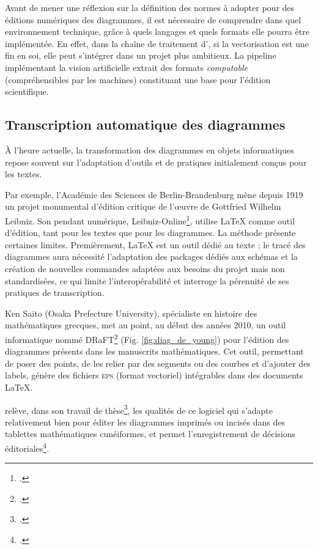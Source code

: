 Avant de mener une réflexion sur la définition des normes à adopter pour
des éditions numériques des diagrammes, il est nécessaire de comprendre
dans quel environnement technique, grâce à quels langages et quels
formats elle pourra être implémentée. En effet, dans la chaîne de
traitement d'\eida, si la vectorisation est une fin en soi, elle peut
s'intégrer dans un projet plus ambitieux. La pipeline implémentant la
vision artificielle extrait des formats \emph{computable}
(compréhensibles par les machines) constituant une base pour l'édition
scientifique.

\hypertarget{transcription-automatique-des-diagrammes}{%
\subsection{Transcription automatique des
diagrammes}\label{transcription-automatique-des-diagrammes}}

À l'heure actuelle, la transformation des diagrammes en objets
informatiques repose souvent sur l'adaptation d'outils et de pratiques
initialement conçus pour les textes.

Par exemple, l'Académie des Sciences de Berlin-Brandenburg mène depuis
1919 un projet monumental d'édition critique de l'œuvre de Gottfried
Wilhelm Leibniz. Son pendant numérique, Leibniz-Online\footcite{noauthor_leibniz_nodate}, utilise
\LaTeX\xspace comme outil d'édition, tant pour les textes que pour les
diagrammes. La méthode présente certaines limites. Premièrement, \LaTeX\xspace
est un outil dédié au texte ; le tracé des diagrammes aura nécessité
l'adaptation des packages dédiés aux schémas et la création de
nouvelles commandes adaptées aux besoins du projet mais non
standardisées, ce qui limite l'interopérabilité et interroge la
pérennité de ses pratiques de transcription.

Ken Saito (Osaka Prefecture University), spécialiste en histoire des
mathématiques grecques, met au point, au début des années 2010, un outil
informatique nommé DRaFT\footcite{noauthor_draft_nodate} (Fig. \ref{fig:diag_de_young}) pour l'édition des diagrammes présents dans les
manuscrits mathématiques. Cet outil, permettant de poser des points, de
les relier par des segments ou des courbes et d'ajouter des labels,
génère des fichiers \textsc{eps} (format vectoriel) intégrables dans des
documents \LaTeX\xspace.

\citeauthor{reynaud_diagrammes_2017} relève, dans son travail de thèse\footcite[p.292]{reynaud_diagrammes_2017}, les qualités de ce logiciel qui s’adapte relativement bien pour éditer les diagrammes imprimés ou incisés dans des tablettes mathématiques cunéiformes, et permet l'enregistrement de décisions éditoriales\footcite[``Pour chacune des lignes
ainsi définies, il est ensuite possible de choisir selon son statut (présente sur le diagramme,
reconstituée, bordure du document, etc) un style différent (plein, tirets, pointillés, etc).''][p.292]{reynaud_diagrammes_2017}.

